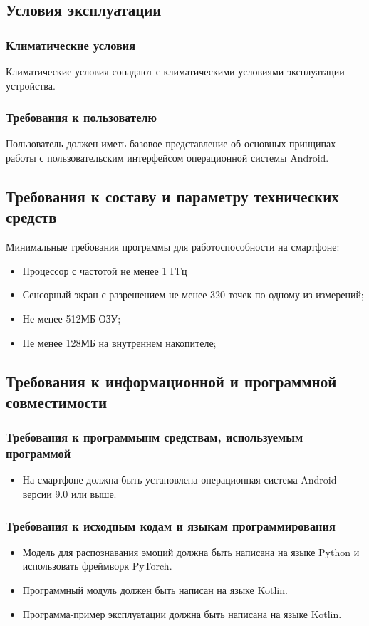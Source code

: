 \documentclass[a4paper,12pt,reqno]{article}
\begin{document}
    \subsection{Условия эксплуатации}
    \subsubsection{Климатические условия}
    Климатические условия сопадают с климатическими условиями эксплуатации устройства.
    \subsubsection{Требования к пользователю}
    Пользователь должен иметь базовое представление об основных принципах работы с пользовательским интерфейсом операционной системы Android.
    \subsection{Требования к составу и параметру технических средств}
    Минимальные требования программы для работоспособности на смартфоне:
    \begin{itemize}
        \item Процессор с частотой не менее 1 ГГц
        \item Сенсорный экран с разрешением не менее 320 точек по одному из измерений;
        \item Не менее 512МБ ОЗУ;
        \item Не менее 128МБ на внутреннем накопителе;
    \end{itemize}
    \subsection{Требования к информационной и программной совместимости}
    \subsubsection{Требования к программынм средствам, используемым программой}
    \begin{itemize}
        \item На смартфоне должна быть установлена операционная система Android версии 9.0 или выше.
    \end{itemize}
    \subsubsection{Требования к исходным кодам и языкам программирования}
    \begin{itemize}
        \item Модель для распознавания эмоций должна быть написана на языке Python и использовать фреймворк PyTorch.
        \item Программный модуль должен быть написан на языке Kotlin.
        \item Программа-пример эксплуатации должна быть написана на языке Kotlin.
    \end{itemize}
\end{document}
